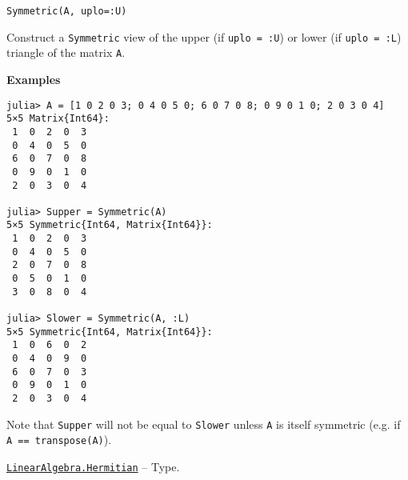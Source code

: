 \begin{adjustwidth}{2em}{0pt}


\begin{verbatim}
Symmetric(A, uplo=:U)
\end{verbatim}

Construct a \texttt{Symmetric} view of the upper (if \texttt{uplo = :U}) or lower (if \texttt{uplo = :L}) triangle of the matrix \texttt{A}.

\textbf{Examples}


\begin{verbatim}
julia> A = [1 0 2 0 3; 0 4 0 5 0; 6 0 7 0 8; 0 9 0 1 0; 2 0 3 0 4]
5×5 Matrix{Int64}:
 1  0  2  0  3
 0  4  0  5  0
 6  0  7  0  8
 0  9  0  1  0
 2  0  3  0  4

julia> Supper = Symmetric(A)
5×5 Symmetric{Int64, Matrix{Int64}}:
 1  0  2  0  3
 0  4  0  5  0
 2  0  7  0  8
 0  5  0  1  0
 3  0  8  0  4

julia> Slower = Symmetric(A, :L)
5×5 Symmetric{Int64, Matrix{Int64}}:
 1  0  6  0  2
 0  4  0  9  0
 6  0  7  0  3
 0  9  0  1  0
 2  0  3  0  4
\end{verbatim}

Note that \texttt{Supper} will not be equal to \texttt{Slower} unless \texttt{A} is itself symmetric (e.g. if \texttt{A == transpose(A)}).



\end{adjustwidth}
\hypertarget{938713992181310063}{}
\hyperlink{938713992181310063}{\texttt{LinearAlgebra.Hermitian}}  -- {Type.}

